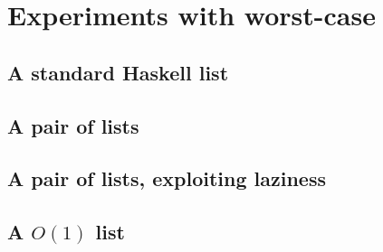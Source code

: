 \section*{Experiments with worst-case}

\subsection*{A standard Haskell list}
\subsection*{A pair of lists}
\subsection*{A pair of lists, exploiting laziness}
\subsection*{A $O(1)$ list}













